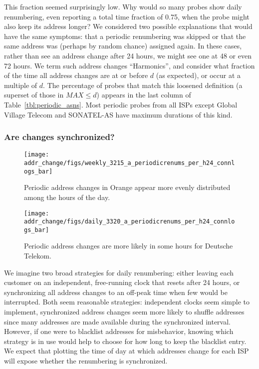 This fraction seemed surprisingly low.  Why would so many
probes show daily renumbering, even reporting a total time
fraction of 0.75, when the probe might also keep its address longer?  We considered two possible explanations that
would have the same symptoms: that a periodic renumbering
was skipped or that the same address was (perhaps by random
chance) assigned again.  In these cases, rather than see an
address change after 24 hours, we might see one at 48 or
even 72 hours.  We term such address changes
``Harmonics'', and consider what fraction
of the time all address changes are at or before $d$ (as
expected), or occur at a multiple of $d$.  The percentage of
probes that match this loosened definition (a superset of those in
$MAX \leq d$) appears in the last column of Table~\ref{tbl:periodic_asns}.
Most periodic probes from all ISPs
except Global Village Telecom and SONATEL-AS have maximum durations of this kind.  

\subsubsection{Are changes synchronized?}

\begin{figure}[th]
 \centering
    \texttt{[image: addr\_change/figs/weekly\_3215\_a\_periodicrenums\_per\_h24\_connlogs\_bar]}
  \caption{\label{fig:3215_renums_per_h24}Periodic address changes
    in Orange appear more evenly distributed among the hours of the
    day.}
\end{figure}

\begin{figure}[th]
  \centering
    \texttt{[image: addr\_change/figs/daily\_3320\_a\_periodicrenums\_per\_h24\_connlogs\_bar]}
  \caption{\label{fig:3320_renums_per_h24}Periodic address changes
    are more likely in some hours for Deutsche Telekom.}
\end{figure}

We imagine two broad strategies for daily renumbering:
either leaving each customer on an independent, free-running
clock that resets after 24 hours, or synchronizing all
address changes to an off-peak time when few would be
interrupted.  Both seem reasonable strategies: independent
clocks seem simple to implement, synchronized address
changes seem more likely to shuffle addresses since many
addresses are made available during the synchronized
interval.  However, if one were to blacklist addresses for
misbehavior, knowing which strategy is in use would help to
choose for how long to keep the blacklist entry.  We expect
that plotting the time of day at which addresses change for
each ISP will expose whether the renumbering is synchronized.

